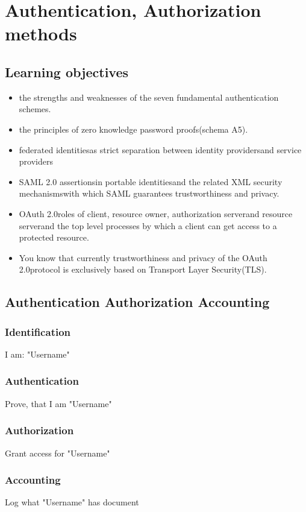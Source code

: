 \documentclass[12pt]{article}
\begin{document}
\section*{Authentication, Authorization methods}
\subsection*{Learning objectives}
\begin{itemize}
    \item the strengths and weaknesses of the seven fundamental authentication schemes.
    \item the principles of zero knowledge password proofs(schema A5).
    \item federated identitiesas strict separation between identity providersand service providers
    \item SAML 2.0 assertionsin    portable identitiesand the related XML security mechanismswith which SAML guarantees trustworthiness and privacy.
    \item OAuth 2.0roles of client,  resource owner,  authorization serverand resource serverand the top level processes by which a client can get access to a protected resource.
    \item You know that currently trustworthiness and privacy of the OAuth 2.0protocol is exclusively based on Transport Layer Security(TLS).
\end{itemize}

\subsection*{Authentication Authorization Accounting}
\subsubsection*{Identification}
I am: "Username"
\subsubsection*{Authentication}
Prove, that I am "Username"
\subsubsection*{Authorization}
Grant access for "Username"
\subsubsection*{Accounting}
Log what "Username" has document
\end{document}
